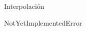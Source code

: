 \documentclass[spanish, c, dvipsnames]{beamer}
\begin{document}
\begin{frame}{Interpolación}
    \begin{center}
        \Huge NotYetImplementedError
    \end{center}
    \end{frame}





\end{document}
